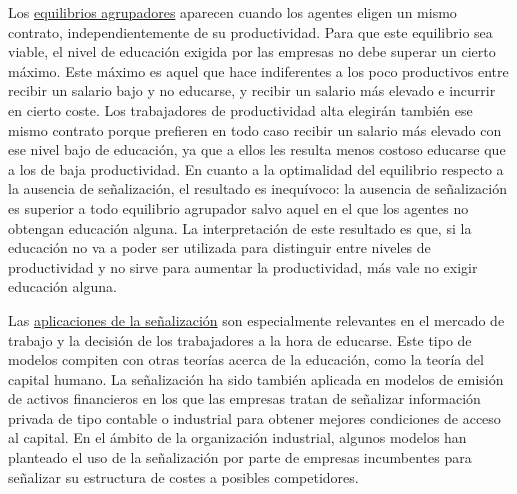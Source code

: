 \documentclass{nuevotema}
\begin{document}
Los \underline{equilibrios agrupadores} aparecen cuando los agentes eligen un mismo contrato, independientemente de su productividad. Para que este equilibrio sea viable, el nivel de educación exigida por las empresas no debe superar un cierto máximo. Este máximo es aquel que hace indiferentes a los poco productivos entre recibir un salario bajo y no educarse, y recibir un salario más elevado e incurrir en cierto coste. Los trabajadores de productividad alta elegirán también ese mismo contrato porque prefieren en todo caso recibir un salario más elevado con ese nivel bajo de educación, ya que a ellos les resulta menos costoso educarse que a los de baja productividad. En cuanto a la optimalidad del equilibrio respecto a la ausencia de señalización, el resultado es inequívoco: la ausencia de señalización es superior a todo equilibrio agrupador salvo aquel en el que los agentes no obtengan educación alguna. La interpretación de este resultado es que, si la educación no va a poder ser utilizada para distinguir entre niveles de productividad y no sirve para aumentar la productividad, más vale no exigir educación alguna.

Las \underline{aplicaciones de la señalización} son especialmente relevantes en el mercado de trabajo y la decisión de los trabajadores a la hora de educarse. Este tipo de modelos compiten con otras teorías acerca de la educación, como la teoría del capital humano. La señalización ha sido también aplicada en modelos de emisión de activos financieros en los que las empresas tratan de señalizar información privada de tipo contable o industrial para obtener mejores condiciones de acceso al capital. En el ámbito de la organización industrial, algunos modelos han planteado el uso de la señalización por parte de empresas incumbentes para señalizar su estructura de costes a posibles competidores.
\end{document}
